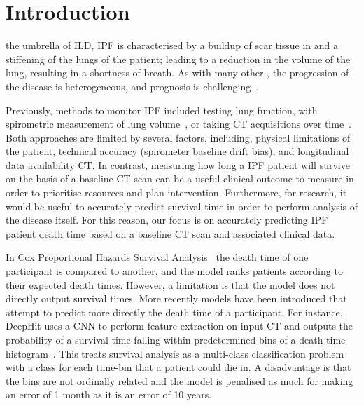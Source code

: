 
\section{Introduction} \label{sec:introduction}
     the umbrella of \gls{ILD}, \gls{IPF} is  characterised by a buildup of scar tissue in and a stiffening of the lungs of the patient; leading to a reduction in the volume of the lung, resulting in a shortness of breath. As with many other , the progression of the disease is heterogeneous, and prognosis is challenging~\cite{King2011IdiopathicFibrosis}. 
    
    Previously, methods to monitor \gls{IPF} included testing lung function, with spirometric measurement of lung volume~\cite{Watters1986AFibrosis}, or taking \gls{CT} acquisitions over time~\cite{Lynch2018DiagnosticPaper}. Both approaches are limited by several factors, including, physical limitations of the patient, technical accuracy (spirometer baseline drift bias), and  longitudinal data availability \gls{CT}.  In contrast, measuring how long a \gls{IPF} patient will survive on the basis of a baseline \gls{CT} scan can be a useful clinical outcome to measure in order to prioritise resources and plan intervention. Furthermore, for research, it would be useful to accurately predict survival time in order to perform analysis of the disease itself. For this reason, our focus is on accurately predicting \gls{IPF} patient death time based on a baseline \gls{CT} scan and associated clinical data.

    In Cox Proportional Hazards Survival Analysis~\cite{Cox1972RegressionLife-Tables} the death time of one participant is compared to another, and the model ranks patients according to their expected death times. However, a limitation is that the model does not directly output survival times.  More recently models have been introduced that attempt to predict more directly the death time of a participant. For instance, DeepHit uses a \gls{CNN} to perform feature extraction on input \gls{CT} and outputs the probability of a survival time falling within predetermined bins of a death time histogram~\cite{Lee2018DeepHit:Risks}. This treats survival analysis as a multi-class classification problem with a class for each time-bin that a patient could die in. A disadvantage is that the bins are not ordinally related and the model is penalised as much for making an error of 1 month as it is an error of 10 years.

